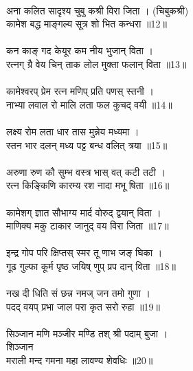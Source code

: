 \\
अना कलित सादृश्य चुबु कश्री विरा जिता । (चिबुकश्री)\\
कामेश बद्ध माङ्गल्य सूत्र शो भित कन्धरा ॥12॥\\
\\
कन काङ् गद केयूर कम नीय भुजान् विता ।\\
रत्नग् ग्रै वेय चिन् ताक लोल मुक्ता फलान् विता ॥13॥\\
\\
कामेश्वरप् प्रेम रत्न मणिप् प्रति पणस् स्तनी ।\\
नाभ्या लवाल रो मालि लता फल कुचद् वयी ॥14॥\\
\\
लक्ष्य रोम लता धार तास मुन्नेय मध्यमा ।\\
स्तन भार दलन् मध्य पट्ट बन्ध वलित् त्रया ॥15॥\\
\\
अरुणा रुण कौ सुम्भ वस्त्र भास् वत् कटी तटी ।	\\
रत्न किङ्किणि कारम्य रश नादा मभू षिता ॥16॥\\
\\
कामेशग् ज्ञात सौभाग्य मार्द वोरुद् द्वयान् विता ।\\
माणिक्य मकु टाकार जानुद् वय विरा जिता ॥17॥\\
\\
इन्द्र गोप परि क्षिप्तस् स्मर तू णाभ जङ् घिका ।\\
गूढ गुल्फा कूर्म पृष्ठ जयिष् णुप् प्रप दान् विता ॥18॥\\
\\
नख दी धिति सं छन्न नमज् जन तमो गुणा ।\\
पदद् वयप् प्रभा जाल परा कृत सरो रुहा ॥19॥\\
\\
सिञ्जान मणि मञ्जीर मण्डि तश् श्री पदाम् बुजा ।\\
{\small{} शिञ्जान}\\
मराली मन्द गमना महा लावण्य शेवधिः ॥20॥\\
